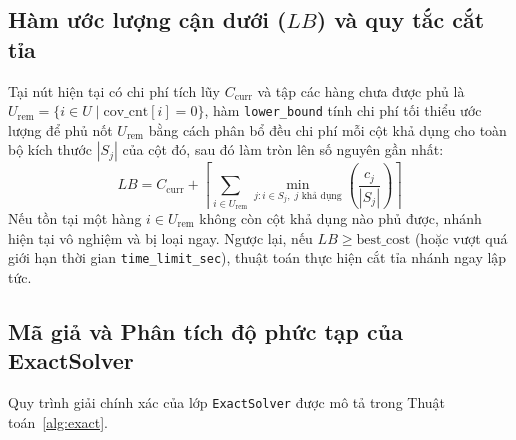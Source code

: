 \documentclass[11pt, a4paper]{article}
\begin{document}
\subsection{Hàm ước lượng cận dưới ($LB$) và quy tắc cắt tỉa}
Tại nút hiện tại có chi phí tích lũy $C_{\text{curr}}$ và tập các hàng chưa được phủ là $U_{\text{rem}} = \{i \in U \mid \text{cov\_cnt}[i] = 0\}$, hàm \texttt{lower\_bound} tính chi phí tối thiểu ước lượng để phủ nốt $U_{\text{rem}}$ bằng cách phân bổ đều chi phí mỗi cột khả dụng cho toàn bộ kích thước $|S_j|$ của cột đó, sau đó làm tròn lên số nguyên gần nhất:
\[
LB = C_{\text{curr}} + \left\lceil \sum_{i \in U_{\text{rem}}} \min_{j : i \in S_j,\; j \text{ khả dụng}} \left( \frac{c_j}{|S_j|} \right) \right\rceil
\]
Nếu tồn tại một hàng $i \in U_{\text{rem}}$ không còn cột khả dụng nào phủ được, nhánh hiện tại vô nghiệm và bị loại ngay. Ngược lại, nếu $LB \ge \text{best\_cost}$ (hoặc vượt quá giới hạn thời gian \texttt{time\_limit\_sec}), thuật toán thực hiện cắt tỉa nhánh ngay lập tức.

\subsection{Mã giả và Phân tích độ phức tạp của ExactSolver}
Quy trình giải chính xác của lớp \texttt{ExactSolver} được mô tả trong Thuật toán~\ref{alg:exact}.
\end{document}
